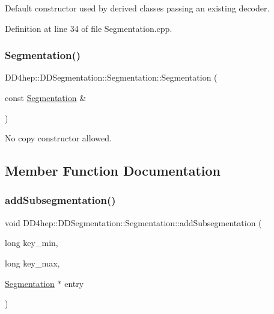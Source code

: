 Default constructor used by derived classes passing an existing decoder. 



Definition at line 34 of file Segmentation.\+cpp.

\hypertarget{class_d_d4hep_1_1_d_d_segmentation_1_1_segmentation_aba1d0cb4ca5528c499ecde5f6000ae01}{}\label{class_d_d4hep_1_1_d_d_segmentation_1_1_segmentation_aba1d0cb4ca5528c499ecde5f6000ae01} 
\subsubsection{\texorpdfstring{Segmentation()}{Segmentation()}\hspace{0.1cm}{\footnotesize\ttfamily [3/3]}}
{\footnotesize\ttfamily D\+D4hep\+::\+D\+D\+Segmentation\+::\+Segmentation\+::\+Segmentation (\begin{DoxyParamCaption}\item[{const \hyperlink{class_d_d4hep_1_1_d_d_segmentation_1_1_segmentation}{Segmentation} \&}]{ }\end{DoxyParamCaption})\hspace{0.3cm}{\ttfamily [private]}}



No copy constructor allowed. 



\subsection{Member Function Documentation}
\hypertarget{class_d_d4hep_1_1_d_d_segmentation_1_1_segmentation_a881469fb51d55c2119e0a94672cb62da}{}\label{class_d_d4hep_1_1_d_d_segmentation_1_1_segmentation_a881469fb51d55c2119e0a94672cb62da} 
\subsubsection{\texorpdfstring{add\+Subsegmentation()}{addSubsegmentation()}}
{\footnotesize\ttfamily void D\+D4hep\+::\+D\+D\+Segmentation\+::\+Segmentation\+::add\+Subsegmentation (\begin{DoxyParamCaption}\item[{long}]{key\+\_\+min,  }\item[{long}]{key\+\_\+max,  }\item[{\hyperlink{class_d_d4hep_1_1_d_d_segmentation_1_1_segmentation}{Segmentation} $\ast$}]{entry }\end{DoxyParamCaption})\hspace{0.3cm}{\ttfamily [virtual]}}



